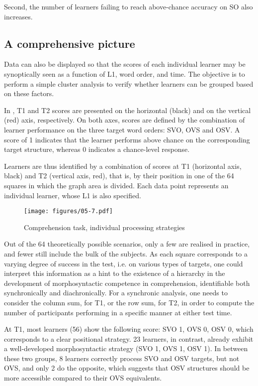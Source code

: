 Second, the number of learners failing to reach above-chance accuracy on SO also increases.

\subsection{A comprehensive picture}\label{sec:05:2.4}

Data can also be displayed so that the scores of each individual learner may be synoptically seen as a function of L1, word order, and time. The objective is to perform a simple cluster analysis to verify whether learners can be grouped based on these factors. 

In , T1 and T2 scores are presented on the horizontal (black) and on the vertical (red) axis, respectively. On both axes, scores are defined by the combination of learner performance on the three target word orders: SVO, OVS and OSV. A score of 1 indicates that the learner performs above chance on the corresponding target structure, whereas 0 indicates a chance-level response.

Learners are thus identified by a combination of scores at T1 (horizontal axis, black) and T2 (vertical axis, red), that is, by their position in one of the 64 squares in which the graph area is divided. Each data point represents an individual learner, whose L1 is also specified.

\begin{figure}
    \texttt{[image: figures/05-7.pdf]}
    \caption{Comprehension task, individual processing strategies}
    \label{fig:05:7}
\end{figure}

Out of the 64 theoretically possible scenarios, only a few are realised in practice, and fewer still include the bulk of the subjects. As each square corresponds to a varying degree of success in the test, i.e. on various types of targets, one could interpret this information as a hint to the existence of a hierarchy in the development of morphosyntactic competence in comprehension, identifiable both synchronically and diachronically. For a synchronic analysis, one needs to consider the column sum, for T1, or the row sum, for T2, in order to compute the number of participants performing in a specific manner at either test time. 

At T1, most learners (56) show the following score: SVO 1, OVS 0, OSV 0, which corresponds to a clear positional strategy. 23 learners, in contrast, already exhibit a well-developed morphosyntactic strategy (SVO 1, OVS 1, OSV 1). In between these two groups, 8 learners correctly process SVO and OSV targets, but not OVS, and only 2 do the opposite, which suggests that OSV structures should be more accessible compared to their OVS equivalents. 

